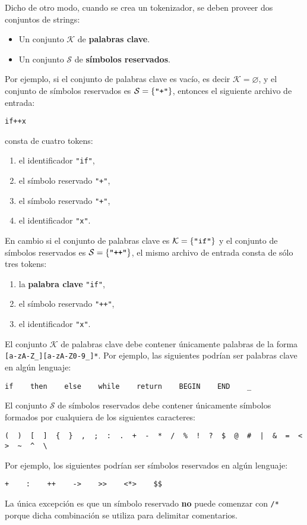 \documentclass{article}
\renewcommand{\emptyset}{\varnothing}
\begin{document}
\begin{itemize}
      Dicho de otro modo, cuando se crea un tokenizador, se deben proveer dos conjuntos de strings:
      \begin{itemize}
      \item Un conjunto $\mathcal{K}$ de {\bf palabras clave}.
      \item Un conjunto $\mathcal{S}$ de {\bf s\'imbolos reservados}.
      \end{itemize}

      Por ejemplo, si el conjunto de palabras clave es vac\'io,
      es decir $\mathcal{K} = \emptyset$,
      y el conjunto de s\'imbolos reservados es
      $\mathcal{S} = \{\verb|"+"|\}$,
      entonces el siguiente archivo de entrada:
      \begin{center}
      \texttt{if++x}
      \end{center}
      consta de cuatro tokens:
      \begin{enumerate}
      \item el identificador \verb|"if"|,
      \item el s\'imbolo reservado \verb|"+"|,
      \item el s\'imbolo reservado \verb|"+"|,
      \item el identificador \verb|"x"|.
      \end{enumerate}

      En cambio si el conjunto de palabras clave es $\mathcal{K} = \{\verb|"if"|\}$
      y el conjunto de s\'imbolos reservados es $\mathcal{S} = \{\verb|"++"|\}$,
      el mismo archivo de entrada consta de s\'olo tres tokens:
      \begin{enumerate}
      \item la {\bf palabra clave} \verb|"if"|,
      \item el s\'imbolo reservado \verb|"++"|,
      \item el identificador \verb|"x"|.
      \end{enumerate}

      El conjunto $\mathcal{K}$ de palabras clave debe contener \'unicamente palabras de la forma \verb|[a-zA-Z_][a-zA-Z0-9_]*|.
      Por ejemplo, las siguientes podr\'ian ser palabras clave en alg\'un lenguaje:
      \begin{center}
      \verb`if    then    else    while    return    BEGIN    END    _`
      \end{center}

      El conjunto $\mathcal{S}$ de s\'imbolos reservados debe contener \'unicamente s\'imbolos
      formados por cualquiera de los siguientes caracteres:
      \begin{center}
      \verb`(  )  [  ]  {  }  ,  ;  :  .  +  -  *  /  %  !  ?  $  @  #  |  &  =  <  >  ~  ^  \`
      \end{center}
      Por ejemplo, los siguientes podr\'ian ser s\'imbolos reservados en alg\'un lenguaje:
      \begin{center}
      \verb|+    :    ++    ->    >>    <*>    $$|
      \end{center}
      La \'unica excepci\'on es que un s\'imbolo reservado {\bf no} puede comenzar con \verb|/*|
      porque dicha combinaci\'on se utiliza para delimitar comentarios.


\end{itemize}
\end{document}
